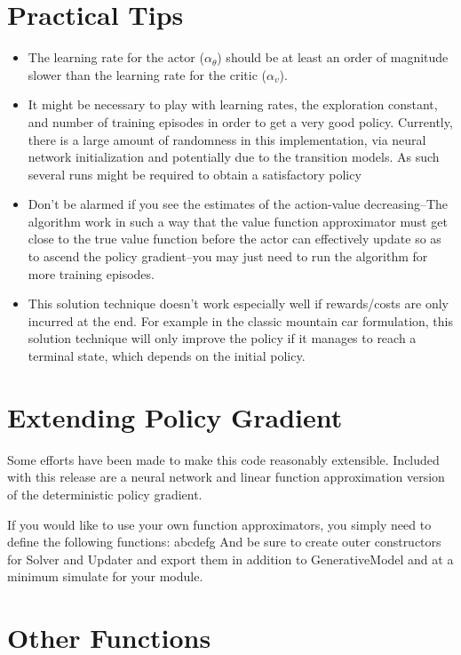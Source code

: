 \documentclass[a4paper]{article}
\begin{document}
\section{Practical Tips}
\begin{itemize}
\item The learning rate for the actor ($\alpha_{\theta}$) should be at least an order of magnitude slower than the learning rate for the critic ($\alpha_{v}$).
\item It might be necessary to play with learning rates, the exploration constant, and number of training episodes in order to get a very good policy. Currently, there is a large amount of randomness in this implementation, via neural network initialization and potentially due to the transition models. As such several runs might be required to obtain a satisfactory policy
\item Don't be alarmed if you see the estimates of the action-value decreasing--The algorithm work in such a way that the value function approximator must get close to the true value function before the actor can effectively update so as to ascend the policy gradient--you may just need to run the algorithm for more training episodes.
\item This solution technique doesn't work especially well if rewards/costs are only incurred at the end. For example in the classic mountain car formulation, this solution technique will only improve the policy if it manages to reach a terminal state, which depends on the initial policy. 
\end{itemize}

\section{Extending Policy Gradient}
Some efforts have been made to make this code reasonably extensible. Included with this release are a neural network and linear function approximation version of the deterministic policy gradient. 

If you would like to use your own function approximators, you simply need to define the following functions:
abcdefg
And be sure to create outer constructors for Solver and Updater and export them in addition to GenerativeModel and at a minimum simulate for your module.

\section{Other Functions}
\end{document}
